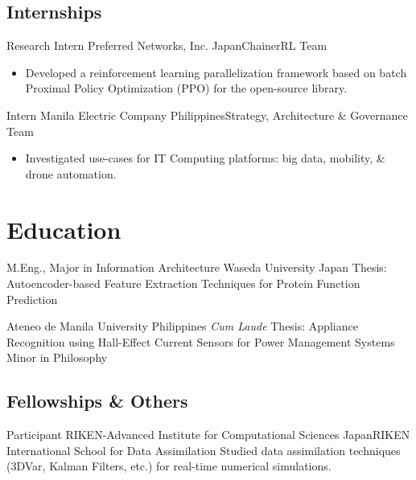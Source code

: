 \documentclass[12pt,a4paper]{moderncv}
\begin{document}
\subsection{Internships}
{Research Intern}
{Preferred Networks, Inc.}
{Japan}{ChainerRL Team}
{
    \begin{itemize}
        \item Developed a reinforcement learning parallelization framework
            based on batch Proximal Policy Optimization (PPO) for the
            open-source
            {\color{blue}}
            library.
    \end{itemize}
}

{Intern}
{Manila Electric Company}
{Philippines}{Strategy, Architecture \& Governance Team}
{
    \begin{itemize}
        \item Investigated use-cases for IT Computing platforms: big
              data, mobility, \& drone automation.
    \end{itemize}
}


\section{Education}
{M.Eng., Major in Information Architecture}
{Waseda University}
{Japan}{}
{Thesis: Autoencoder-based Feature Extraction Techniques for Protein
    Function Prediction}

{Ateneo de Manila University}
{Philippines}
{\textit{Cum Laude}}
{
    Thesis: Appliance Recognition using Hall-Effect Current Sensors for
    Power Management Systems\\
    Minor in Philosophy
}


\subsection{Fellowships \& Others}

{Participant}
{RIKEN-Advanced Institute for Computational Sciences}
{Japan}{RIKEN International School for Data Assimilation}
{Studied data assimilation techniques (3DVar, Kalman Filters, etc.) for real-time numerical simulations.}
\end{document}
